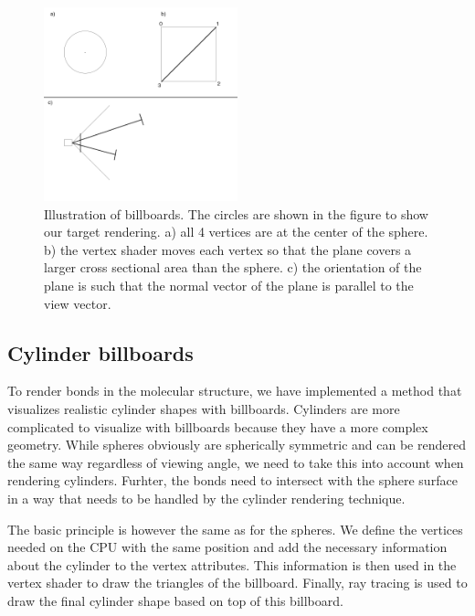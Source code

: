 \documentclass[aps,pre,twocolumn,letterpaper,floatfix,nofootinbib]{revtex4}
\begin{document}
\begin{figure}
	\centering
	\includegraphics[width=0.5\textwidth]{spherebillboards.png}
	\caption{Illustration of billboards. The circles are shown in the figure to show our target rendering. a) all 4 vertices are at the center of the sphere. b) the vertex shader moves each vertex so that the plane covers a larger cross sectional area than the sphere. c) the orientation of the plane is such that the normal vector of the plane is parallel to the view vector. }
	\label{fig:billboards}
\end{figure}

\subsection{Cylinder billboards}
%
To render bonds in the molecular structure, we have implemented a method that
visualizes realistic cylinder shapes with billboards.
Cylinders are more complicated to visualize with billboards because they have a
more complex geometry.
While spheres obviously are spherically symmetric and can be rendered the same
way regardless of viewing angle, we need to take this into account when
rendering cylinders.
Furhter, the bonds need to intersect with the sphere surface in a way that
needs to be handled by the cylinder rendering technique.

The basic principle is however the same as for the spheres.
We define the vertices needed on the CPU with the same position and add the
necessary information about the cylinder to the vertex attributes.
This information is then used in the vertex shader to draw the triangles of
the billboard.
Finally, ray tracing is used to draw the final cylinder shape based on top
of this billboard.

\end{document}
